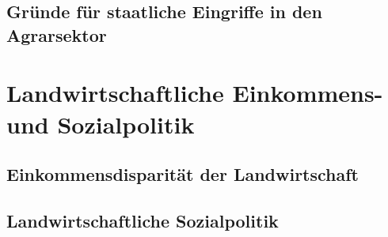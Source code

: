 \documentclass[11pt]{scrartcl}
\begin{document}
\subsection{Gründe für staatliche Eingriffe in den Agrarsektor}

\section{Landwirtschaftliche Einkommens- und Sozialpolitik}
\subsection{Einkommensdisparität der Landwirtschaft}


\subsection{Landwirtschaftliche Sozialpolitik}
\end{document}
